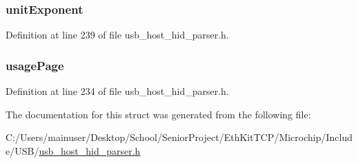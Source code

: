 \subsubsection[{unit\+Exponent}]{ unit\+Exponent}\label{struct___h_i_d___g_l_o_b_a_l_s_a48cc4979b42ac62d7635e93bbc5dda4f}


Definition at line 239 of file usb\+\_\+host\+\_\+hid\+\_\+parser.\+h.

\hypertarget{struct___h_i_d___g_l_o_b_a_l_s_aa44ef18c8cbb507831398f1e85c62d0b}{}
\subsubsection[{usage\+Page}]{ usage\+Page}\label{struct___h_i_d___g_l_o_b_a_l_s_aa44ef18c8cbb507831398f1e85c62d0b}


Definition at line 234 of file usb\+\_\+host\+\_\+hid\+\_\+parser.\+h.



The documentation for this struct was generated from the following file\+:\begin{DoxyCompactItemize}
\item 
C\+:/\+Users/mainuser/\+Desktop/\+School/\+Senior\+Project/\+Eth\+Kit\+T\+C\+P/\+Microchip/\+Include/\+U\+S\+B/\hyperlink{usb__host__hid__parser_8h}{usb\+\_\+host\+\_\+hid\+\_\+parser.\+h}\end{DoxyCompactItemize}
